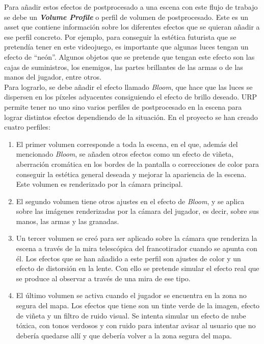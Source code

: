 Para añadir estos efectos de postprocesado a una escena con este flujo de trabajo se debe un \textit{\textbf{Volume Profile}} o perfil de volumen de postprocesado. Este es un asset que contiene información sobre los diferentes efectos que se quieran añadir a ese perfil concreto. Por ejemplo, para conseguir la estética futurista que se pretendía tener en este videojuego, es importante que algunas luces tengan un efecto de ``neón''. Algunos objetos que se pretende que tengan este efecto son las cajas de suministros, los enemigos, las partes brillantes de las armas o de las manos del jugador, entre otros.\\
Para lograrlo, se debe añadir el efecto llamado \textit{Bloom}, que hace que las luces se dispersen en los píxeles adyacentes consiguiendo el efecto de brillo deseado. 
URP permite tener no uno sino varios perfiles de postprocesado en la escena para lograr distintos efectos dependiendo de la situación. En el proyecto se han creado cuatro perfiles:
\begin{enumerate}
    \item El primer volumen corresponde a toda la escena, en el que, además del mencionado \textit{Bloom}, se añaden otros efectos como un efecto de viñeta, aberración cromática en los bordes de la pantalla o correcciones de color para conseguir la estética general deseada y mejorar la apariencia de la escena. Este volumen es renderizado por la cámara principal.
    \item El segundo volumen tiene otros ajustes en el efecto de \textit{Bloom}, y se aplica sobre las imágenes renderizadas por la cámara del jugador, es decir, sobre sus manos, las armas y las granadas.
    \item Un tercer volumen se creó para ser aplicado sobre la cámara que renderiza la escena a través de la mira telescópica del francotirador cuando se apunta con él. Los efectos que se han añadido a este perfil son ajustes de color y un efecto de distorsión en la lente. Con ello se pretende simular el efecto real que se produce al observar a través de una mira de ese tipo.
    \item El último volumen se activa cuando el jugador se encuentra en la zona no segura del mapa. Los efectos que tiene son un tinte verde de la imagen, efecto de viñeta y un filtro de ruido visual. Se intenta simular un efecto de nube tóxica, con tonos verdosos y con ruido para intentar avisar al usuario que no debería quedarse allí y que debería volver a la zona segura del mapa.
    \end{enumerate}
